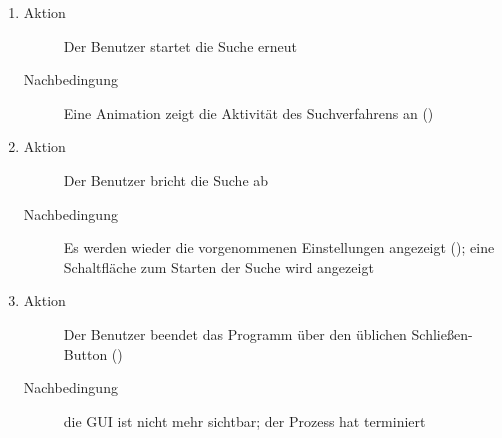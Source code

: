 \begin{description}
\begin{enumerate}
\begin{description}
		\end{description}
		\item
		\begin{description}
			\item[Aktion] Der Benutzer startet die Suche erneut
			\item[Nachbedingung] Eine Animation zeigt die Aktivität des Suchverfahrens an ()
		\end{description}
		\item
		\begin{description}
			\item[Aktion] Der Benutzer bricht die Suche ab
			\item[Nachbedingung] Es werden wieder die vorgenommenen Einstellungen angezeigt (); eine Schaltfläche zum Starten der Suche wird angezeigt
		\end{description}
		\item
		\begin{description}
			\item[Aktion] Der Benutzer beendet das Programm über den üblichen Schließen-Button ()
			\item[Nachbedingung] die GUI ist nicht mehr sichtbar; der Prozess hat terminiert
		\end{description}
	\end{enumerate}


\end{description}

